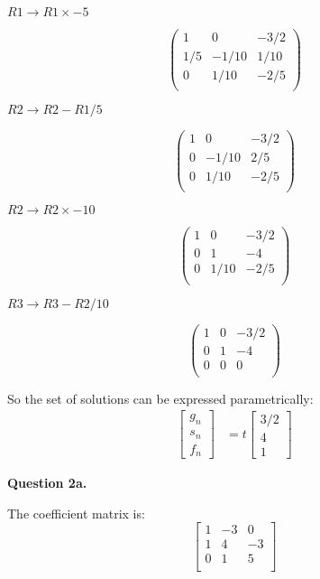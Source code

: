 \documentclass[12pt,a4paper]{report}
\begin{document}
\(R1 \rightarrow R1 \times -5 \)
 
 \[
 \left(\begin{array}{rrr}
 1 & 0 & -3/2         \\
 1/5 & -1/10 & 1/10 \\
 0 & 1/10 & -2/5 \\
    \end{array} \right)
\]

\(R2 \rightarrow R2 -R1 / 5 \)
 
 \[
 \left(\begin{array}{rrr}
 1 & 0 & -3/2 \\
 0 & -1/10 & 2/5 \\
 0 & 1/10 & -2/5 \\
    \end{array} \right)
\]

\(R2 \rightarrow R2 \times -10 \)
 
 \[
 \left(\begin{array}{rrr}
 1 & 0 & -3/2 \\
 0 & 1 & -4     \\
 0 & 1/10 & -2/5 \\
    \end{array} \right)
\]

\(R3 \rightarrow R3 -R2 / 10 \)
 
 \[
 \left(\begin{array}{rrr}
 1 & 0 & -3/2 \\
 0 & 1 & -4 \\
 0 & 0 & 0      \\
   \end{array} \right)
\]

So the set of solutions can be expressed parametrically:
\begin{align*}
\begin{bmatrix}g_n\\s_n\\f_n\end{bmatrix} &= t \begin{bmatrix}3/2\\4\\1\end{bmatrix}
\end{align*} 


\textbf{Question 2a.}

The coefficient matrix is:
 \[
 \left[\begin{array}{rrr}
   1 & -3 &  0 \\
   1 &  4 & -3 \\
   0 &  1 &  5 \\
   \end{array} \right]
\]
\end{document}
